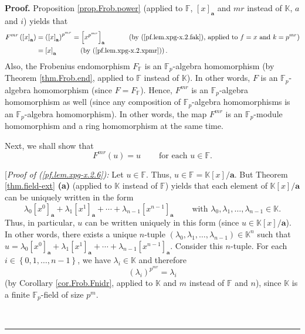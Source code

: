 \documentclass[numbers=enddot,12pt,final,onecolumn,notitlepage]{scrartcl}%
\theoremstyle{definition}
\newenvironment{proof}[1][Proof]{\noindent\textbf{#1.} }{\ \rule{0.5em}{0.5em}}
\begin{document}
\begin{proof}
Proposition \ref{prop.Frob.power} (applied to $\mathbb{F}$, $\left[  x\right]
_{\mathbf{a}}$ and $mr$ instead of $\mathbb{K}$, $a$ and $i$) yields that
\begin{align}
F^{mr}\left(  \left[  x\right]  _{\mathbf{a}}\right)   &  =\left(  \left[
x\right]  _{\mathbf{a}}\right)  ^{p^{mr}}=\left[  x^{p^{mr}}\right]
_{\mathbf{a}}\ \ \ \ \ \ \ \ \ \ \left(  \text{by (\ref{pf.lem.xpg-x.2.fak}),
applied to }f=x\text{ and }k=p^{mr}\right) \nonumber\\
&  =\left[  x\right]  _{\mathbf{a}}\ \ \ \ \ \ \ \ \ \ \left(  \text{by
(\ref{pf.lem.xpg-x.2.xpmr})}\right)  . \label{pf.lem.xpg-x.2.5}%
\end{align}
Also, the Frobenius endomorphism $F_{\mathbb{F}}$ is an $\mathbb{F}_{p}%
$-algebra homomorphism (by Theorem \ref{thm.Frob.end}, applied to $\mathbb{F}$
instead of $\mathbb{K}$). In other words, $F$ is an $\mathbb{F}_{p}$-algebra
homomorphism (since $F=F_{\mathbb{F}}$). Hence, $F^{mr}$ is an $\mathbb{F}%
_{p}$-algebra homomorphism as well (since any composition of $\mathbb{F}_{p}%
$-algebra homomorphisms is an $\mathbb{F}_{p}$-algebra homomorphism). In other
words, the map $F^{mr}$ is an $\mathbb{F}_{p}$-module homomorphism and a ring
homomorphism at the same time.

Next, we shall show that
\begin{equation}
F^{mr}\left(  u\right)  =u\ \ \ \ \ \ \ \ \ \ \text{for each }u\in\mathbb{F}.
\label{pf.lem.xpg-x.2.6}%
\end{equation}


[\textit{Proof of (\ref{pf.lem.xpg-x.2.6}):} Let $u\in\mathbb{F}$. Thus,
$u\in\mathbb{F}=\mathbb{K}\left[  x\right]  /\mathbf{a}$. But Theorem
\ref{thm.field-ext} \textbf{(a)} (applied to $\mathbb{K}$ instead of
$\mathbb{F}$) yields that each element of $\mathbb{K}\left[  x\right]
/\mathbf{a}$ can be uniquely written in the form%
\[
\lambda_{0}\left[  x^{0}\right]  _{\mathbf{a}}+\lambda_{1}\left[
x^{1}\right]  _{\mathbf{a}}+\cdots+\lambda_{n-1}\left[  x^{n-1}\right]
_{\mathbf{a}}\ \ \ \ \ \ \ \ \ \ \text{with }\lambda_{0},\lambda_{1}%
,\ldots,\lambda_{n-1}\in\mathbb{K}.
\]
Thus, in particular, $u$ can be written uniquely in this form (since
$u\in\mathbb{K}\left[  x\right]  /\mathbf{a}$). In other words, there exists a
unique $n$-tuple $\left(  \lambda_{0},\lambda_{1},\ldots,\lambda_{n-1}\right)
\in\mathbb{K}^{n}$ such that $u=\lambda_{0}\left[  x^{0}\right]  _{\mathbf{a}%
}+\lambda_{1}\left[  x^{1}\right]  _{\mathbf{a}}+\cdots+\lambda_{n-1}\left[
x^{n-1}\right]  _{\mathbf{a}}$. Consider this $n$-tuple. For each
$i\in\left\{  0,1,\ldots,n-1\right\}  $, we have $\lambda_{i}\in\mathbb{K}$
and therefore%
\begin{equation}
\left(  \lambda_{i}\right)  ^{p^{mr}}=\lambda_{i}
\label{pf.lem.xpg-x.2.6.pf.coeff-pow}%
\end{equation}
(by Corollary \ref{cor.Frob.Fnidr}, applied to $\mathbb{K}$ and $m$ instead of
$\mathbb{F}$ and $n$), since $\mathbb{K}$ is a finite $\mathbb{F}_{p}$-field
of size $p^{m}$.


\end{proof}
\end{document}
